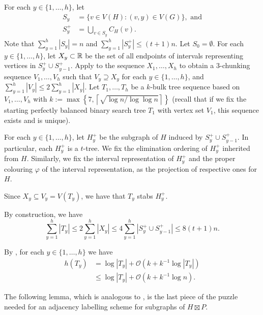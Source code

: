 \documentclass[kpfonts]{patmorin}
\newcommand{\Oh}{\mathcal{O}}
\let\le\leqslant
\let\leq\leqslant
\begin{document}
For each $y\in\{1,\dots,h\}$, let 
\begin{align*}
S_y&=\{v\in V(H): (v,y)\in V(G)\}, \text{ and}\\
S^+_y&=\textstyle\bigcup_{v\in S_y} C_H(v).
\end{align*}
Note that $\sum_{y=1}^h |S_y| =n$ and $\sum_{y=1}^h |S^+_y| \leq (t+1)n$.
Let $S_0=\emptyset$. 
For each $y\in\{1,\dots,h\}$, let $X_y\subset\mathbb{R}$ be the set of all endpoints of intervals representing vertices in $S^+_y\cup S^+_{y-1}$. 
Apply  to the sequence $X_1,\dots,X_h$ to obtain a $3$-chunking sequence $V_1,\dots,V_{h}$ such that $V_y\supseteq X_y$ for each $y\in\{1,\dots,h\}$, and $\sum_{y=1}^h |V_y|\le 2\sum_{y=1}^h |X_y|$. Let $T_1,\dots,T_h$ be a $k$-bulk tree sequence based on $V_1,\dots,V_{h}$ with $k := \max\left\{7,\left\lceil\sqrt{\log n / \log\log n}\right\rceil\right\}$ (recall that if we fix the starting perfectly balanced binary search tree $T_1$ with vertex set $V_1$, this sequence exists and is unique).

For each $y\in\{1,\dots,h\}$, let $H^+_y$ be the subgraph of $H$ induced by $S^+_y\cup S^+_{y-1}$. 
In particular, each $H^+_y$ is a $t$-tree. 
We fix the elimination ordering of $H^+_y$ inherited from $H$.
Similarly, we fix the interval representation of $H^+_y$ and the proper colouring $\varphi$ of the interval representation, as the projection of respective ones for $H$.

Since $X_y \subseteq V_y = V(T_y)$, we have that $T_y$ stabs $H^+_y$.

By construction, we have
\[
\textstyle\sum_{y=1}^h |T_y| \le 2\textstyle\sum_{y=1}^h |X_y| \le 4\textstyle\sum_{y=1}^h |S^+_y\cup S^+_{y-1}| \le 8(t+1)n.
\]

By , for each $y\in\{1,\dots,h\}$ we have
\begin{align*}
h(T_y)&= \log |T_y| + \Oh(k+k^{-1}\log |T_y|)\\
&\leq \log |T_y| + \Oh(k+k^{-1}\log n).
\end{align*}

The following lemma, which is analogous to , is the last piece of the puzzle needed for an adjacency labelling scheme for subgraphs of $H\boxtimes P$. 
\end{document}
